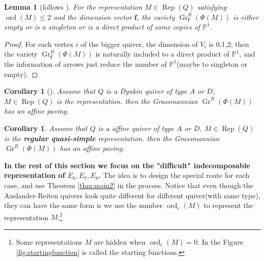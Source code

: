 \documentclass[reqno,11pt]{amsart}
\numberwithin{equation}{section}
\theoremstyle{plain}
\newtheorem{lemma}[theorem]{Lemma}
\newtheorem{corollary}[theorem]{Corollary}
\theoremstyle{plain}
\numberwithin{equation}{section}
\theoremstyle{remark}
\DeclareMathOperator{\Rep}{\operatorname{Rep}}
\newcommand{\Grr}{\operatorname{Gr}^{R}}
\newcommand{\dimvec}[1]{\mathbf{#1}}
\newcommand{\ord}{\operatorname{ord}}
\newcommand{\orde}{\operatorname{ord}_e }
\begin{document}
\begin{lemma}[{follows \cite[Lemma 2.22]{maksimau2019flag}}]\label{lem:smallvecdim}
	For the representation $M \in \Rep(Q)$ satisfying $\ord(M) \leqslant 2$ and the dimension vector $\dimvec{f}$, the variety $\Grr_{\dimvec{f}}(\Phi(M))$ is either empty or is a singleton or is a direct product of some copies of $\mathbb{P}^1$.
\end{lemma}
\begin{proof}
	For each vertex $i$ of the bigger quiver, the dimension of $V_i$ is 0,1,2; then the variety $\Grr_{\dimvec{f}}(\Phi(M))$ is naturally included to a direct product of $\mathbb{P}^1$, and the information of arrows just reduce the number of $\mathbb{P}^1$(maybe to singleton or empty).
\end{proof}
\begin{corollary}[{\cite[Theorem 2.20]{maksimau2019flag}}]\label{cor:affinepavingofAD}
	Assume that $Q$ is a Dynkin quiver of type $A$ or $D$, $M \in \Rep(Q)$ is the representation. then the Grassmannian $\Grr(\Phi(M))$ has an affine paving.
\end{corollary}
\begin{corollary}\label{cor:affineADcase}
	Assume that $Q$ is a affine quiver of type $A$ or $D$, $M \in \Rep(Q)$ is the \textbf{regular quasi-simple} representation. then the Grassmannian $\Grr(\Phi(M))$ has an affine paving.
\end{corollary}

\textbf{In the rest of this section we focus on the "difficult" indecomposable representation of $E_6,E_7,E_8$.} The idea is to design the special route for each case, and use Theorem \ref{thm:main2} in the process. Notice that even though the Auslander-Reiten quivers look quite different for different quiver(with same type), they can have the same form is we use the number $\orde(M)$ to represent the representation $M$:\footnote{Some representations $M$ are hidden when $\orde(M)=0$. In \cite{bongartz1984critical} the Figure \ref{fig:startingfunction} is called the starting functions.}
\end{document}
